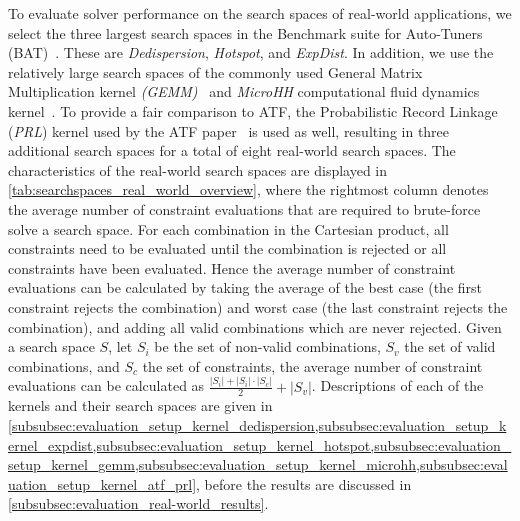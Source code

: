 To evaluate solver performance on the search spaces of real-world applications, we select the three largest search spaces in the Benchmark suite for Auto-Tuners (BAT)~\cite{BenchmarkingSuiteKerneltuners}. 
These are \textit{Dedispersion}, \textit{Hotspot}, and \textit{ExpDist}. 
In addition, we use the relatively large search spaces of the commonly used General Matrix Multiplication kernel \textit{(GEMM)}~\cite{CLBlast2018} and \textit{MicroHH} computational fluid dynamics kernel~\cite{MicroHH2017}. 
To provide a fair comparison to ATF, the Probabilistic Record Linkage (\textit{PRL}) kernel used by the ATF paper~\cite{searchspaceATF} is used as well, resulting in three additional search spaces for a total of eight real-world search spaces. 
The characteristics of the real-world search spaces are displayed in \cref{tab:searchspaces_real_world_overview}, where the rightmost column denotes the average number of constraint evaluations that are required to brute-force solve a search space. For each combination in the Cartesian product, all constraints need to be evaluated until the combination is rejected or all constraints have been evaluated. Hence the average number of constraint evaluations can be calculated by taking the average of the best case (the first constraint rejects the combination) and worst case (the last constraint rejects the combination), and adding all valid combinations which are never rejected. Given a search space $S$, let $S_i$ be the set of non-valid combinations, $S_v$ the set of valid combinations, and $S_c$ the set of constraints, the average number of constraint evaluations can be calculated as $\frac{|S_i|+|S_i| \cdot |S_c|}{2}+|S_v|$. 
Descriptions of each of the kernels and their search spaces are given in \cref{subsubsec:evaluation_setup_kernel_dedispersion,subsubsec:evaluation_setup_kernel_expdist,subsubsec:evaluation_setup_kernel_hotspot,subsubsec:evaluation_setup_kernel_gemm,subsubsec:evaluation_setup_kernel_microhh,subsubsec:evaluation_setup_kernel_atf_prl}, before the results are discussed in \cref{subsubsec:evaluation_real-world_results}.

